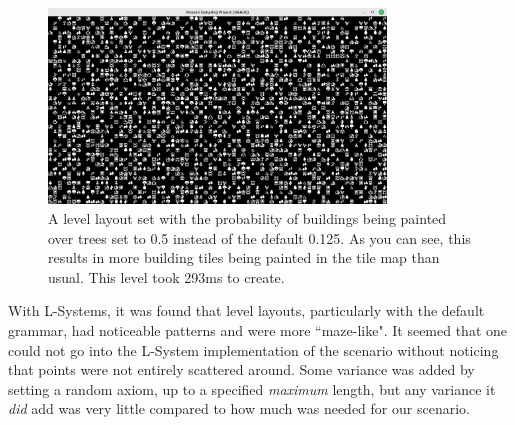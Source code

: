 \begin{figure}[H]
    \centering
    \includegraphics[width=0.8\textwidth]{Images/poisson-buildings-0.5.png}
    \caption{A level layout set with the probability of buildings being painted over trees set to 0.5 instead of the default 0.125. As you can see, this results in more building tiles being painted in the tile map than usual. This level took 293ms to create.}
    \label{fig:poisson5}
\end{figure}

With L-Systems, it was found that level layouts, particularly with the default grammar, had noticeable patterns and were more ``maze-like". It seemed that one could not go into the L-System implementation of the scenario without noticing that points were not entirely scattered around. Some variance was added by setting a random axiom, up to a specified \textit{maximum} length, but any variance it \textit{did} add was very little compared to how much was needed for our scenario.

